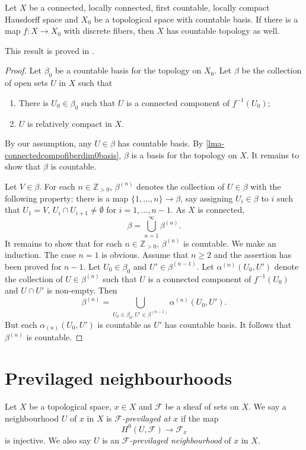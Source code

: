 \begin{proposition}\label{prop-fiberdiscountablebasisinh}
    Let $X$ be a connected, locally connected, first countable, locally compact Hausdorff space and $X_0$ be a topological space with countable basis. If there is a map $f:X\rightarrow X_0$ with discrete fibers, then $X$ has countable topology as well.
\end{proposition}
This result is proved in \cite{Jur59}.

\begin{proof}
    Let $\beta_0$ be a countable basis for the topology on $X_0$. Let $\beta$ be the collection of open sets $U$ in $X$ such that
    \begin{enumerate}
        \item There is $U_0\in \beta_0$ such that $U$ is a connected component of $f^{-1}(U_0)$;
        \item $U$ is relatively compact in $X$.
    \end{enumerate}
    By our assumption, any $U\in \beta$ has countable basis. By \cref{lma-connectedcompofiberdim0basis}, $\beta$ is a basis for the topology on $X$. It remains to show that $\beta$ is countable.

    Let $V\in \beta$. For each $n\in \mathbb{Z}_{>0}$, $\beta^{(n)}$ denotes the collection of $U\in \beta$ with the following property: there is a map $\{1,\ldots,n\}\rightarrow \beta$, say assigning $U_i\in \beta$ to $i$ such that $U_1=V$, $U_i\cap U_{i+1}\neq \emptyset$ for $i=1,\ldots,n-1$. As $X$ is connected,
    \[
        \beta=\bigcup_{n=1}^{\infty}\beta^{(n)}.  
    \]
    It remains to show that for each $n\in \mathbb{Z}_{>0}$, $\beta^{(n)}$ is countable. We make an induction. The case $n=1$ is obvious. Assume that $n\geq 2$ and the assertion has been proved for $n-1$. Let $U_0\in \beta_0$ and $U'\in \beta^{(n-1)}$. Let $\alpha^{(n)}(U_0,U')$ denote the collection of $U\in \beta^{(n)}$ such that $U$ is a connected component of $f^{-1}(U_0)$ and $U\cap U'$ is non-empty. Then
    \[
        \beta^{(n)}=\bigcup_{U_0\in \beta_0,U'\in \beta^{(n-1)}}\alpha^{(n)}(U_0,U').  
    \]
    But each $\alpha_{(n)}(U_0,U')$ is countable as $U'$ has countable basis. It follows that $\beta^{(n)}$ is countable.
\end{proof}

\section{Previlaged neighbourhoods}
\begin{definition}
    Let $X$ be a topological space, $x\in X$ and $\mathcal{F}$ be a sheaf of sets on $X$. We say a neighbourhood $U$ of $x$ in $X$ is \emph{$\mathcal{F}$-previlaged at $x$} if the map
    \[
        H^0(U,\mathcal{F})\rightarrow \mathcal{F}_x  
    \]
    is injective. We also say $U$ is an \emph{$\mathcal{F}$-previlaged neighbourhood} of $x$ in $X$.
\end{definition}

